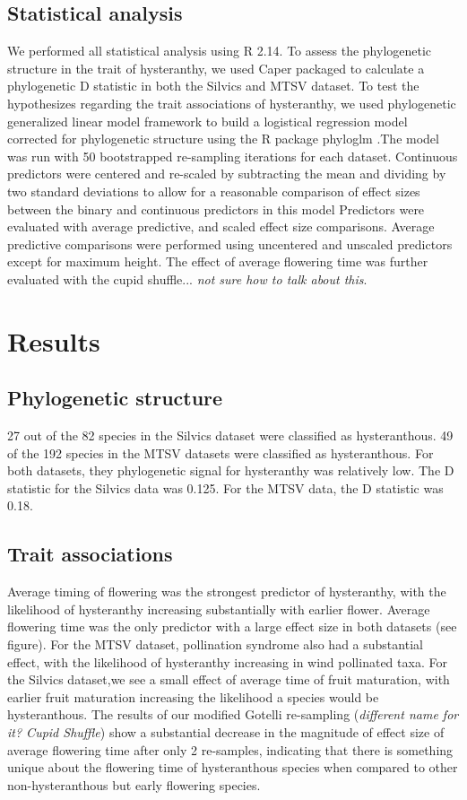 \documentclass{article}\usepackage[]{graphicx}\usepackage[]{color}
\begin{document}
\begin{itemize}
\subsection*{Statistical analysis}
We performed all statistical analysis using R 2.14. To assess the phylogenetic structure in the trait of hysteranthy, we used Caper packaged \citep{} to calculate a phylogenetic D statistic \citep{Fritz2010} in both the Silvics and MTSV dataset. To test the hypothesizes regarding the trait associations of hysteranthy, we used phylogenetic generalized linear model framework \citep{Ives2010} to build a logistical regression model corrected for phylogenetic structure using the R package phyloglm \citep{}.The model was run with 50 bootstrapped re-sampling iterations for each dataset. Continuous predictors were centered and re-scaled by subtracting the mean and dividing by two standard deviations to allow for a reasonable comparison of effect sizes between the binary and continuous predictors in this model \citep{Gelman} Predictors were evaluated with average predictive, and scaled effect size comparisons. Average predictive comparisons were performed using uncentered and unscaled predictors except for maximum height. %
The effect of average flowering time was further evaluated with the cupid shuffle... \textit{not sure how to talk about this}.  
\section*{Results}
\subsection*{Phylogenetic structure}
27 out of the 82 species in the Silvics dataset were classified as hysteranthous. 49 of the 192 species in the MTSV datasets were classified as hysteranthous. For both datasets, they phylogenetic signal for hysteranthy was relatively low. The D statistic for the Silvics data was 0.125. For the MTSV data, the D statistic was 0.18.
\subsection*{Trait associations}
Average timing of flowering was the strongest predictor of hysteranthy, with the likelihood of hysteranthy increasing substantially with earlier flower. Average flowering time was the only predictor with a large effect size in both datasets (see figure). For the MTSV dataset, pollination syndrome also had a substantial effect, with the likelihood of hysteranthy increasing in wind pollinated taxa. For the Silvics dataset,we see a small effect of average time of fruit maturation, with earlier fruit maturation increasing the likelihood a species would be hysteranthous. The results of our modified Gotelli re-sampling (\textit{different name for it? Cupid Shuffle}) show a substantial decrease in the magnitude of effect size of average flowering time after only 2 re-samples, indicating that there is something unique about the flowering time of hysteranthous species when compared to other non-hysteranthous but early flowering species.

\end{itemize}
\end{document}
